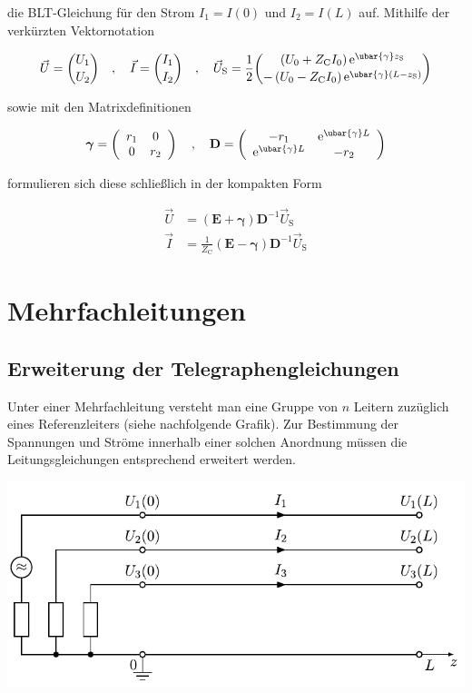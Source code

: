 die BLT-Gleichung für den Strom $I_{1}=I(0)$ und $I_{2}=I(L)$ auf. Mithilfe der verkürzten Vektornotation


\begin{equation}
	\vec{U}=\binom{U_{1}}{U_{2}} \quad, \quad \vec{I}=\binom{I_{1}}{I_{2}} \quad, \quad \vec{U}_{\mathrm{S}}=\frac{1}{2}\binom{\left(U_{0}+Z_{\mathrm{C}} I_{0}\right) \mathrm{e}^{\ubar{\gamma} z_{\mathrm{S}}}}{-\left(U_{0}-Z_{\mathrm{C}} I_{0}\right) \mathrm{e}^{\ubar{\gamma}\left(L-z_{\mathrm{S}}\right)}} 
\end{equation}


sowie mit den Matrixdefinitionen

\begin{equation}
	\boldsymbol{\gamma}=\left(\begin{array}{cc}
		r_{1} & 0  \\
		0 & r_{2}
	\end{array}\right) \quad, \quad \mathbf{D}=\left(\begin{array}{cc}
		-r_{1} & \mathrm{e}^{\ubar{\gamma} L} \\
		\mathrm{e}^{\ubar{\gamma} L} & -r_{2}
	\end{array}\right)
\end{equation}

formulieren sich diese schließlich in der kompakten Form


\begin{align}
	\vec{U} & =(\mathbf{E}+\boldsymbol{{\gamma}}) \mathbf{D}^{-1} \vec{U}_{\mathrm{S}}  \\
	\vec{I} & =\frac{1}{Z_{\mathrm{C}}}(\mathbf{E}-\boldsymbol{\gamma}) \mathbf{D}^{-1} \vec{U}_{\mathrm{S}} 
\end{align}


\section{Mehrfachleitungen}
\subsection{Erweiterung der Telegraphengleichungen}
Unter einer Mehrfachleitung versteht man eine Gruppe von $n$ Leitern zuzüglich eines Referenzleiters (siehe nachfolgende Grafik). Zur Bestimmung der Spannungen und Ströme innerhalb einer solchen Anordnung müssen die Leitungsgleichungen entsprechend erweitert werden.

\begin{center}
	\includegraphics{res/LT7}
\end{center}

